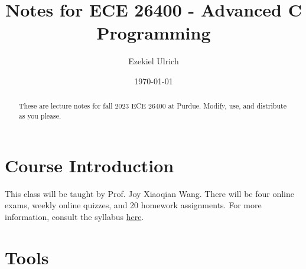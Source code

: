 \documentclass[nobib]{tufte-handout}
\title{Notes for ECE 26400 - Advanced C Programming}
\author[Ezekiel Ulrich]{Ezekiel Ulrich}
\date{\today}  %
\begin{document}
\maketitle

\begin{abstract}
These are lecture notes for fall 2023 ECE 26400 at Purdue. Modify, use, and distribute as you please.
\end{abstract}

\tableofcontents

\section{Course Introduction}

This class will be taught by Prof. Joy Xiaoqian Wang. There will be four online exams, 
weekly online quizzes, and 20 homework assignments. For more information, 
consult the syllabus \href{https://github.com/ezekielulrich/Notes/blob/d83855d25b40c224ce70b0b46ae6a86adc5a783f/ECE%20264%20Fall%202023%20Syllabus.pdf}{here}.

\section{Tools}
\end{document}
